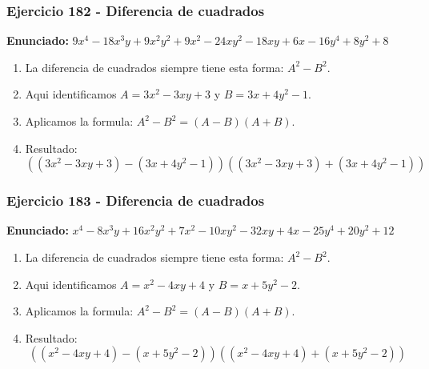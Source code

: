 \documentclass[11pt,a4paper]{article}
\begin{document}
\vspace{0.2cm}
\subsubsection*{Ejercicio 182 - Diferencia de cuadrados}
\textbf{Enunciado:} $ 9 x^{4} - 18 x^{3} y + 9 x^{2} y^{2} + 9 x^{2} - 24 x y^{2} - 18 x y + 6 x - 16 y^{4} + 8 y^{2} + 8 $\par
\begin{enumerate}[leftmargin=2em]
\item La diferencia de cuadrados siempre tiene esta forma: \(A^2-B^2\).
\item Aqui identificamos \(A=3 x^{2} - 3 x y + 3\) y \(B=3 x + 4 y^{2} - 1\).
\item Aplicamos la formula: \(A^2-B^2=(A-B)(A+B)\).
\item Resultado: \[\boxed{\left(\left(3 x^{2} - 3 x y + 3\right)-\left(3 x + 4 y^{2} - 1\right)\right)\left(\left(3 x^{2} - 3 x y + 3\right)+\left(3 x + 4 y^{2} - 1\right)\right)}\]
\end{enumerate}

\vspace{0.2cm}
\subsubsection*{Ejercicio 183 - Diferencia de cuadrados}
\textbf{Enunciado:} $ x^{4} - 8 x^{3} y + 16 x^{2} y^{2} + 7 x^{2} - 10 x y^{2} - 32 x y + 4 x - 25 y^{4} + 20 y^{2} + 12 $\par
\begin{enumerate}[leftmargin=2em]
\item La diferencia de cuadrados siempre tiene esta forma: \(A^2-B^2\).
\item Aqui identificamos \(A=x^{2} - 4 x y + 4\) y \(B=x + 5 y^{2} - 2\).
\item Aplicamos la formula: \(A^2-B^2=(A-B)(A+B)\).
\item Resultado: \[\boxed{\left(\left(x^{2} - 4 x y + 4\right)-\left(x + 5 y^{2} - 2\right)\right)\left(\left(x^{2} - 4 x y + 4\right)+\left(x + 5 y^{2} - 2\right)\right)}\]
\end{enumerate}

\vspace{0.2cm}
\end{document}
